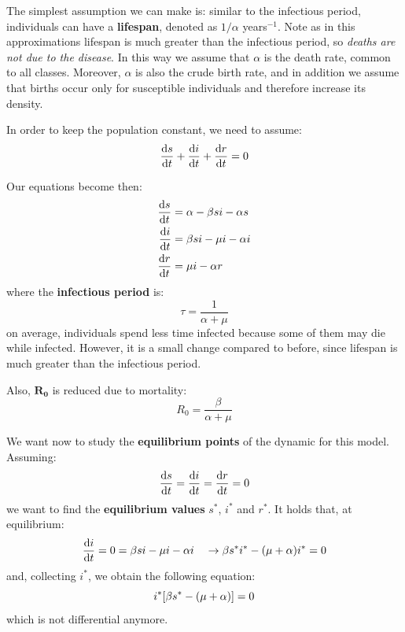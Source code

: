\documentclass[../main/main.tex]{subfiles}
\begin{document}
The simplest assumption we can make is: similar to the infectious period, individuals can have a \textbf{lifespan}, denoted as \( 1/\alpha  \) years$^{-1}$. Note as in this approximations lifespan is much greater than the infectious period, so \textit{deaths are not due to the disease}. In this way we assume that \( \alpha  \) is the death rate, common to all classes. Moreover, \( \alpha  \) is also the crude birth rate, and in addition we assume that births occur only for susceptible individuals and therefore increase its density.

In order to keep the population constant, we need to assume:
\begin{equation}
  \dv{s}{t} + \dv{i}{t} + \dv{r}{t} = 0
\end{equation}

Our equations become then:
\begin{equation}
\begin{split}
  \dv{s}{t} &= \alpha - \beta s i - \alpha s  \\
  \dv{i}{t} &= \beta s i - \mu i - \alpha i \\
  \dv{r}{t} &= \mu i - \alpha r
\end{split}
\end{equation}
where the \textbf{infectious period} is:
\begin{equation}
  \tau = \frac{1}{\alpha + \mu }
\end{equation}
on average, individuals spend less time infected because some of them may die while infected. However, it is a small change compared to before, since lifespan is much greater than the infectious period.

Also, \( \mathbf{R_0} \) is reduced due to mortality:
\begin{equation}
  R_0 = \frac{\beta }{\alpha + \mu }
\end{equation}

We want now to study the \textbf{equilibrium points} of the dynamic for this model. Assuming:
\begin{equation*}
  \dv{s}{t} = \dv{i}{t} = \dv{r}{t} = 0
\end{equation*}
we want to find the \textbf{equilibrium values}  \( s^* \), \( i^* \) and \( r^* \).
It holds that, at equilibrium:
\begin{equation*}
  \dv{i}{t} = 0 = \beta s i - \mu i - \alpha i \quad \rightarrow   \beta s^* i^* - (\mu + \alpha ) i^* = 0
\end{equation*}
and, collecting $i^*$, we obtain the following equation:
\begin{equation}
  i^* \qty[\beta s^* - (\mu + \alpha )] = 0
\end{equation}
which is not differential anymore.
\end{document}
